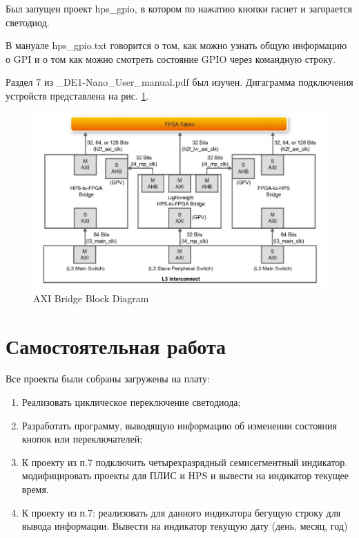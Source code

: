 \documentclass[a4paper,14pt]{article}
\begin{document}
	Был запущен проект hps\_gpio, в котором по нажатию кнопки гаснет и загорается светодиод.
	
	В мануале hps\_gpio.txt говорится о том, как можно узнать общую информацию о GPI и о том как можно смотреть состояние GPIO через командную строку.
	
	Раздел 7 из \_DE1-Nano\_User\_manual.pdf был изучен. Дигаграмма подключения устройств представлена на рис. \ref{fig:axi-bridge-block-diagram}.
	
	\begin{figure}[H]
		\centering
		\includegraphics[width=0.7\linewidth]{"images/AXI Bridge Block Diagram"}
		\caption{AXI Bridge Block Diagram}
		\label{fig:axi-bridge-block-diagram}
	\end{figure}
	
	

	\section{Самостоятельная работа}
	
	Все проекты были собраны загружены на плату:
	
	\begin{enumerate}
		\item Реализовать циклическое переключение светодиода;
		
		\item Разработать программу, выводящую информацию об изменении состояния кнопок или переключателей;
		
		\item К проекту из п.7 подключить четырехразрядный семисегментный индикатор. модифицировать проекты для ПЛИС и HPS и вывести на индикатор текущее время.
		
		\item К проекту из п.7: реализовать для данного индикатора бегущую строку для вывода информации. Вывести на индикатор текущую дату (день, месяц, год)
	\end{enumerate}
	
\end{document}
